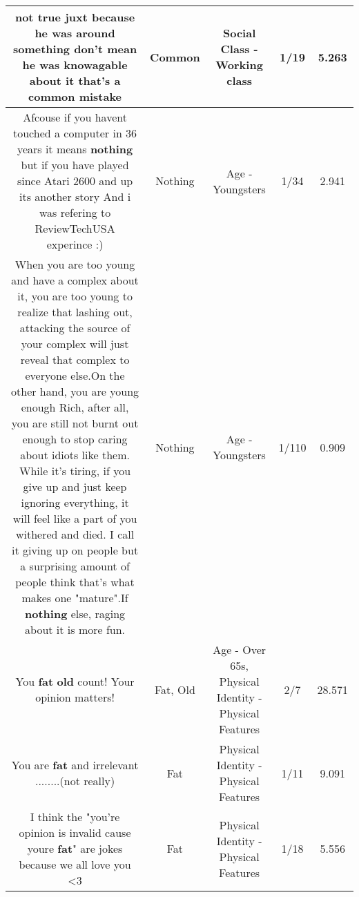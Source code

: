 \documentclass[11pt]{article}
\newlength\mylength
\begin{document}
\begin{center}
\begin{longtable}{|C{.65\mylength}|C{.30\mylength}|C{.12\mylength}|C{.12\mylength}|C{.12\mylength}|}
  \small not true juxt because he was around something don't  mean he was knowagable about it  that's a \textbf{common} mistake\normalsize   & Common & Social Class - Working class & 1/19 & 5.263 \\  \hline
  \small Afcouse if you havent touched a computer in 36 years it means \textbf{nothing} but if you have played since Atari 2600 and up its another story And i was refering to ReviewTechUSA experince :)\normalsize   & Nothing & Age - Youngsters & 1/34 & 2.941 \\  \hline
  \small When you are too young and have a complex about it, you are too young to realize that lashing out, attacking the source of your complex will just reveal that complex to everyone else.On the other hand, you are young enough Rich, after all, you are still not burnt out enough to stop caring about idiots like them. While it's tiring, if you give up and just keep ignoring everything, it will feel like a part of you withered and died. I call it giving up on people but a surprising amount of people think that's what makes one "mature".If \textbf{nothing} else, raging about it is more fun.\normalsize   & Nothing & Age - Youngsters & 1/110 & 0.909 \\  \hline
  \small You \textbf{fat} \textbf{old} count! Your opinion matters!\normalsize   & Fat, Old & Age - Over 65s, Physical Identity - Physical Features & 2/7 & 28.571 \\  \hline
  \small You are \textbf{fat} and irrelevant ........(not really)\normalsize   & Fat & Physical Identity - Physical Features & 1/11 & 9.091 \\  \hline
  \small I think the "you're opinion is invalid cause youre \textbf{fat}" are jokes because we all love you <3\normalsize   & Fat & Physical Identity - Physical Features & 1/18 & 5.556 \\  \hline

\end{longtable}
\end{center}
\end{document}
